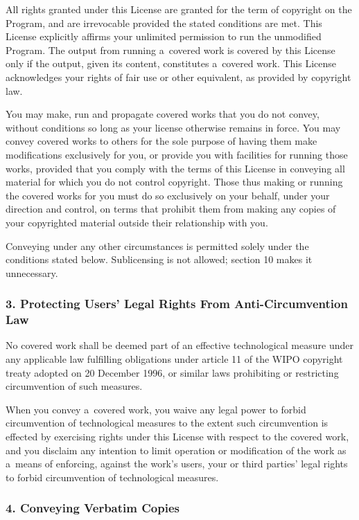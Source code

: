 \documentclass[a4paper, 11pt, twoside]{article}
\begin{document}
All rights granted under this License are granted for the term of copyright on the Program, and are irrevocable provided the stated conditions are met. This License explicitly affirms your unlimited permission to run the unmodified Program. The output from running a~covered work is covered by this License only if the output, given its content, constitutes a~covered work. This License acknowledges your rights of fair use or other equivalent, as provided by copyright law.

You may make, run and propagate covered works that you do not convey, without conditions so long as your license otherwise remains in force. You may convey covered works to others for the sole purpose of having them make modifications exclusively for you, or provide you with facilities for running those works, provided that you comply with the terms of this License in conveying all material for which you do not control copyright. Those thus making or running the covered works for you must do so exclusively on your behalf, under your direction and control, on terms that prohibit them from making any copies of your copyrighted material outside their relationship with you.

Conveying under any other circumstances is permitted solely under the conditions stated below. Sublicensing is not allowed; section 10 makes it unnecessary.

\subsubsection{3. Protecting Users' Legal Rights From Anti-Circumvention Law}

No covered work shall be deemed part of an effective technological measure under any applicable law fulfilling obligations under article 11 of the WIPO copyright treaty adopted on 20 December 1996, or similar laws prohibiting or restricting circumvention of such measures.

When you convey a~covered work, you waive any legal power to forbid circumvention of technological measures to the extent such circumvention is effected by exercising rights under this License with respect to the covered work, and you disclaim any intention to limit operation or modification of the work as a~means of enforcing, against the work's users, your or third parties' legal rights to forbid circumvention of technological measures.

\subsubsection{4. Conveying Verbatim Copies}
\end{document}
